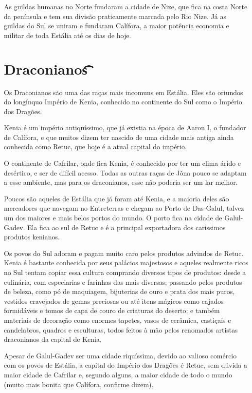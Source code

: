 \documentclass{RPG_Adventure}[2021/10/20]
\begin{document}
As guildas humanas no Norte fundaram a cidade de Nize, que fica na costa Norte
da península e tem sua divisão praticamente marcada pelo Rio Nize. Já as guildas
do Sul se uniram e fundaram Calífora, a maior potência economia e militar de
toda Estália até os dias de hoje.

\section*{Draconianos\t\t\t\t\t\t\t\t\t\t\t}%
\label{sec:draconianos}

Os Draconianos são uma das raças mais incomuns em Estália. Eles são oriundos do
longínquo Império de Kenia, conhecido no continente do Sul como o Império dos
Dragões.

Kenia é um império antiquíssimo, que já existia na época de Aaron I, o fundador
de Calífora, e que muitos dizem ter nascido de uma cidade mais antiga ainda
conhecida como Retuc, que hoje é a atual capital do império.

O continente de Cafrilar, onde fica Kenia, é conhecido por ter um clima árido e
desértico, e ser de difícil acesso. Todas as outras raças de Jǒna pouco se
adaptam a esse ambiente, mas para os draconianos, esse não poderia ser um lar
melhor.

Poucos são aqueles de Estália que já foram até Kenia, e a maioria deles são
mercadores que navegam no Entreterras e chegam ao Porto de Das-Galul, talvez um
dos maiores e mais belos portos do mundo. O porto fica na cidade de Galul-Gadev.
Ela fica ao sul de Retuc e é a principal exportadora dos caríssimos produtos
kenianos.

Os povos do Sul adoram e pagam muito caro pelos produtos advindos de Retuc.
Kenia é bastante conhecida por seus palácios majestosos e aqueles realmente
ricos no Sul tentam copiar essa cultura comprando diversos tipos de produtos:
desde a culinária, com especiarias e farinhas das mais diversas; passando pelos
produtos de beleza, como pó de maquiagem, bijuterias de ouro e prata dos mais
puros, vestidos cravejados de gemas preciosas ou até itens mágicos como cajados
formidáveis e tomos de capa de couro de criaturas do deserto; e também materiais
de decoração como enormes tapetes, vasos de cerâmica, castiçais e candelabros,
quadros e esculturas, todos feitos à mão pelos renomados artistas draconianos da
capital de Kenia.

Apesar de Galul-Gadev ser uma cidade riquíssima, devido ao valioso comércio com
os povos de Estália, a capital do Império dos Dragões é Retuc, sem dúvida a
maior cidade de Cafrilar e, segundo alguns, a maior cidade de todo o mundo
(muito mais bonita que Calífora, confirme dizem).
\end{document}
